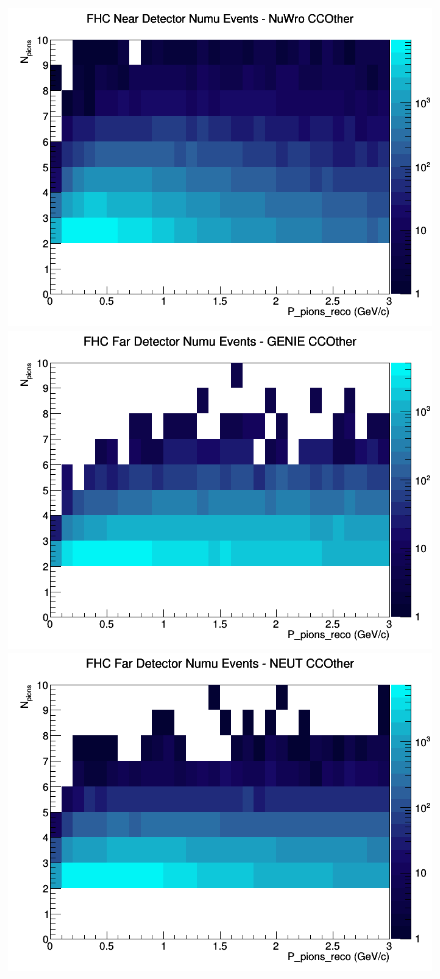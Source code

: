 \documentclass[12pt]{article}
\begin{document}
\begin{figure}[h]
\includegraphics[width=\linewidth]{eff_N_P/GAr/pions/CCOther_FHC_ND_numu_N_P_NuWro.png}
\endminipage
\newline
{}
\includegraphics[width=\linewidth]{eff_N_P/GAr/pions/CCOther_FHC_FD_numu_N_P_GENIE.png}
\endminipage
{}
\includegraphics[width=\linewidth]{eff_N_P/GAr/pions/CCOther_FHC_FD_numu_N_P_NEUT.png}

\end{figure}
\end{document}
